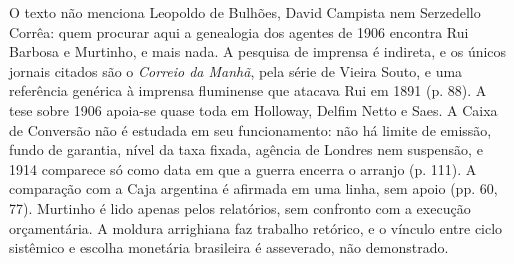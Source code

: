 O texto não menciona Leopoldo de Bulhões, David Campista nem Serzedello Corrêa:
quem procurar aqui a genealogia dos agentes de 1906 encontra Rui Barbosa e
Murtinho, e mais nada. A pesquisa de imprensa é indireta, e os únicos jornais
citados são o \emph{Correio da Manhã}, pela série de Vieira Souto, e uma
referência genérica à imprensa fluminense que atacava Rui em 1891 (p. 88). A tese
sobre 1906 apoia-se quase toda em Holloway, Delfim Netto e Saes. A Caixa de
Conversão não é estudada em seu funcionamento: não há limite de emissão, fundo de
garantia, nível da taxa fixada, agência de Londres nem suspensão, e 1914 comparece
só como data em que a guerra encerra o arranjo (p. 111). A comparação com a Caja
argentina é afirmada em uma linha, sem apoio (pp. 60, 77). Murtinho é lido apenas
pelos relatórios, sem confronto com a execução orçamentária. A moldura arrighiana
faz trabalho retórico, e o vínculo entre ciclo sistêmico e escolha monetária
brasileira é asseverado, não demonstrado.

